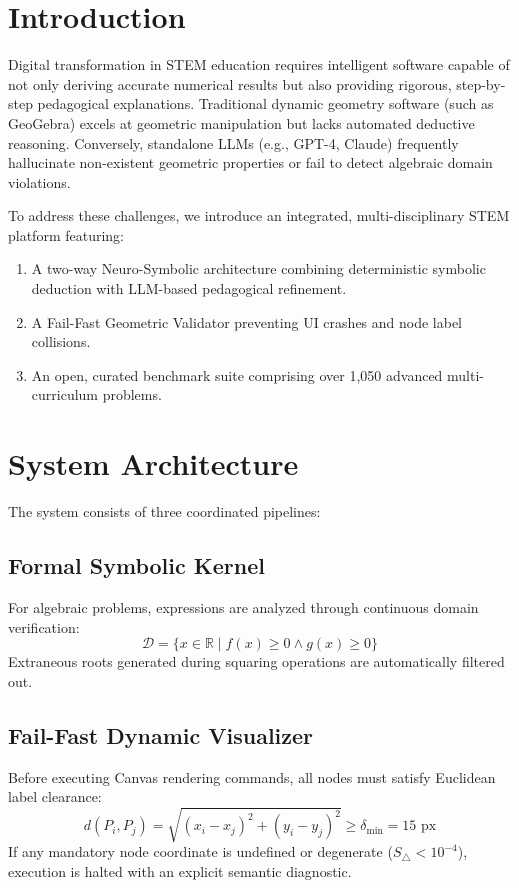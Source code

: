 \documentclass[conference]{IEEEtran}
\begin{document}
\section{Introduction}
Digital transformation in STEM education requires intelligent software capable of not only deriving accurate numerical results but also providing rigorous, step-by-step pedagogical explanations. Traditional dynamic geometry software (such as GeoGebra) excels at geometric manipulation but lacks automated deductive reasoning. Conversely, standalone LLMs (e.g., GPT-4, Claude) frequently hallucinate non-existent geometric properties or fail to detect algebraic domain violations.

To address these challenges, we introduce an integrated, multi-disciplinary STEM platform featuring:
\begin{enumerate}
    \item A two-way Neuro-Symbolic architecture combining deterministic symbolic deduction with LLM-based pedagogical refinement.
    \item A Fail-Fast Geometric Validator preventing UI crashes and node label collisions.
    \item An open, curated benchmark suite comprising over 1,050 advanced multi-curriculum problems.
\end{enumerate}

\section{System Architecture}
The system consists of three coordinated pipelines:
\subsection{Formal Symbolic Kernel}
For algebraic problems, expressions are analyzed through continuous domain verification:
\begin{equation}
\mathcal{D} = \{x \in \mathbb{R} \mid f(x) \ge 0 \land g(x) \ge 0\}
\end{equation}
Extraneous roots generated during squaring operations are automatically filtered out.

\subsection{Fail-Fast Dynamic Visualizer}
Before executing Canvas rendering commands, all nodes must satisfy Euclidean label clearance:
\begin{equation}
d(P_i, P_j) = \sqrt{(x_i - x_j)^2 + (y_i - y_j)^2} \ge \delta_{\min} = 15\text{ px}
\end{equation}
If any mandatory node coordinate is undefined or degenerate ($S_{\triangle} < 10^{-4}$), execution is halted with an explicit semantic diagnostic.
\end{document}
